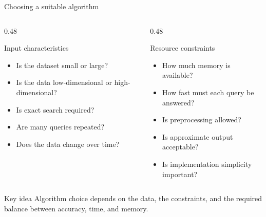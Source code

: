 \documentclass[aspectratio=169]{beamer}
\begin{document}
\begin{frame}{Choosing a suitable algorithm}
  \small

  \begin{columns}[T]
    \begin{column}{0.48\textwidth}
      \begin{block}{Input characteristics}
        \begin{itemize}
          \item Is the dataset small or large?
          \item Is the data low-dimensional or high-dimensional?
          \item Is exact search required?
          \item Are many queries repeated?
          \item Does the data change over time?
        \end{itemize}
      \end{block}
    \end{column}

    \begin{column}{0.48\textwidth}
      \begin{exampleblock}{Resource constraints}
        \begin{itemize}
          \item How much memory is available?
          \item How fast must each query be answered?
          \item Is preprocessing allowed?
          \item Is approximate output acceptable?
          \item Is implementation simplicity important?
        \end{itemize}
      \end{exampleblock}
    \end{column}
  \end{columns}

  \vspace{0.35cm}

  \begin{alertblock}{Key idea}
    Algorithm choice depends on the data, the constraints, and the required balance between accuracy, time, and memory.
  \end{alertblock}
\end{frame}
\end{document}
